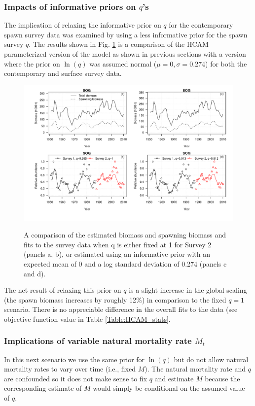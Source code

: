 		\subsubsection{Impacts of informative priors on $q$'s}
The implication of relaxing the informative prior on $q$ for the contemporary spawn survey data was examined by using a less informative prior for the spawn survey $q$. The results shown in Fig. \ref{fig:qFix_qPrior} is a comparison of the HCAM parameterized version of the model as shown in previous sections with a version where the prior on $\ln(q)$ was assumed normal ($\mu=0, \sigma = 0.274$) for both the contemporary and surface survey data.
\begin{figure}[!tbp]
	\includegraphics[width=\textwidth]{../FIGS/iscam_fig_HCAM_qFix_qPrior.pdf}\\
	\caption{A comparison of the estimated biomass and spawning biomass and fits to the survey data when q is either fixed at 1 for Survey 2 (panels a, b), or  estimated using an informative prior with an expected mean of 0 and a log standard deviation of 0.274 (panels c and d).}\label{fig:qFix_qPrior}
\end{figure}

The net result of relaxing this prior on $q$ is a slight increase in the global scaling (the spawn biomass increases by roughly 12\%) in comparison to the fixed $q=1$ scenario.  There is no appreciable difference in the overall fits to the data (see objective function value in Table \ref{Table:HCAM_stats}.
		
		\subsubsection{Implications of variable natural mortality rate $M_t$}
	In this next scenario we use the same prior for $\ln(q)$ but do not allow natural mortality rates to vary over time (i.e., fixed $M$).  The natural mortality rate and $q$ are confounded so it does not make sense to fix $q$ and estimate $M$ because the corresponding estimate of $M$ would simply be conditional on the assumed value of $q$.
	
